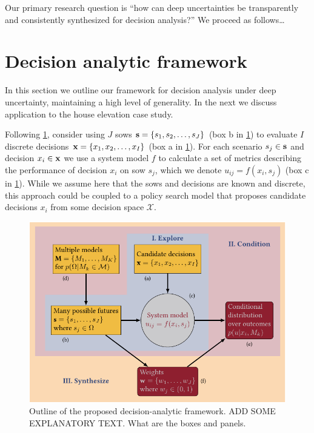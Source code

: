 \documentclass[11pt]{article}
\begin{document}
Our primary research question is ``how can deep uncertainties be transparently and consistently synthesized for decision analysis?''
We proceed as follows\ldots

\section{Decision analytic framework}\label{sec:analysis}

In this section we outline our framework for decision analysis under deep uncertainty, maintaining a high level of generality.
In the next we discuss application to the house elevation case study.

Following \cref{fig:flowchart}, consider using $J$ \glspl{sow} $\vb{s} = \qty{s_1, s_2, \ldots, s_J}$ (box b in \cref{fig:flowchart}) to evaluate $I$ discrete decisions $\vb{x} = \qty{x_1, x_2, \ldots, x_I}$ (box a in \cref{fig:flowchart}).
For each scenario $s_j \in \vb{s}$ and decision $x_i \in \vb{x}$ we use a system model $f$ to calculate a set of metrics describing the performance of decision $x_i$ on \gls{sow} $s_j$, which we denote $u_{ij} = f(x_i, s_j)$ (box c in \cref{fig:flowchart}).
While we assume here that the \glspl{sow} and decisions are known and discrete, this approach could be  coupled to a policy search model that proposes candidate decisions $x_i$ from some decision space $\mathcal{X}$.

\begin{figure}
    \centering
    \includegraphics[width=\textwidth]{bayes-rdm.pdf}
    \caption{
        Outline of the proposed decision-analytic framework.
        ADD SOME EXPLANATORY TEXT. What are the boxes and panels. %
    }\label{fig:flowchart}
\end{figure}
\end{document}
